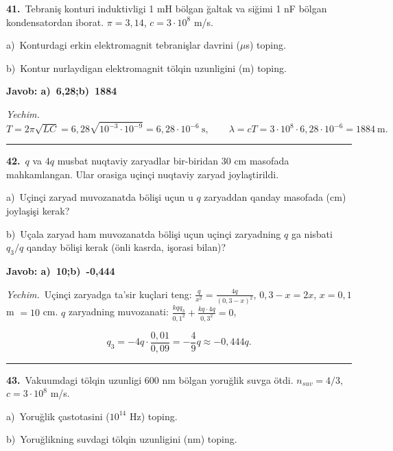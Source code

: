 \documentclass[11pt,a4paper]{article}
\begin{document}
\noindent\textbf{41.}\ Tebraniş konturi induktivligi 1 mH bölgan ğaltak va siğimi 1 nF bölgan kondensatordan iborat. $\pi=3{,}14$, $c=3\cdot10^8$ m/s.\par
\noindent\hspace*{4mm}a)\ Konturdagi erkin elektromagnit tebranişlar davrini ($\mu$s) toping.\par
\noindent\hspace*{4mm}b)\ Kontur nurlaydigan elektromagnit tölqin uzunligini (m) toping.\par
\noindent\colorbox{gray!12}{\parbox{\dimexpr\linewidth-2\fboxsep}{\textbf{Javob: a)\ 6,28;\quad b)\ 1884}}}\par\smallskip
\noindent\textit{Yechim.}\ \[T=2\pi\sqrt{LC}=6{,}28\sqrt{10^{-3}\cdot10^{-9}}=6{,}28\cdot10^{-6}\ \text{s},\qquad \lambda=cT=3\cdot10^8\cdot6{,}28\cdot10^{-6}=1884\ \text{m}.\]\par\medskip\hrule\medskip
{}\noindent\textbf{42.}\ $q$ va $4q$ musbat nuqtaviy zaryadlar bir-biridan 30 cm masofada mahkamlangan. Ular orasiga uçinçi nuqtaviy zaryad joylaştirildi.\par
\noindent\hspace*{4mm}a)\ Uçinçi zaryad muvozanatda bölişi uçun u $q$ zaryaddan qanday masofada (cm) joylaşişi kerak?\par
\noindent\hspace*{4mm}b)\ Uçala zaryad ham muvozanatda bölişi uçun uçinçi zaryadning $q$ ga nisbati $q_3/q$ qanday bölişi kerak (önli kasrda, işorasi bilan)?\par
\noindent\colorbox{gray!12}{\parbox{\dimexpr\linewidth-2\fboxsep}{\textbf{Javob: a)\ 10;\quad b)\ -0,444}}}\par\smallskip
\noindent\textit{Yechim.}\ Uçinçi zaryadga ta’sir kuçlari teng: $\frac{q}{x^2}=\frac{4q}{(0{,}3-x)^2}$, $0{,}3-x=2x$, $x=0{,}1$ m $=10$ cm. $q$ zaryadning muvozanati: $\frac{kqq_3}{0{,}1^2}+\frac{kq\cdot4q}{0{,}3^2}=0$,\par
\[q_3=-4q\cdot\frac{0{,}01}{0{,}09}=-\frac49q\approx-0{,}444q.\]\par\medskip\hrule\medskip
{}\noindent\textbf{43.}\ Vakuumdagi tölqin uzunligi 600 nm bölgan yoruğlik suvga ötdi. $n_{suv}=4/3$, $c=3\cdot10^8$ m/s.\par
\noindent\hspace*{4mm}a)\ Yoruğlik çastotasini ($10^{14}$ Hz) toping.\par
\noindent\hspace*{4mm}b)\ Yoruğlikning suvdagi tölqin uzunligini (nm) toping.\par
\end{document}
